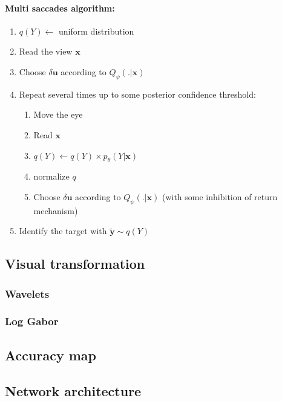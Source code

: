\paragraph{Multi saccades algorithm:}
\begin{enumerate}
\item $q(Y) \leftarrow$ uniform distribution
\item Read the view $\boldsymbol{x}$
\item Choose $\delta\boldsymbol{u}$ according to $Q_\psi(.|\boldsymbol{x})$
\item Repeat several times up to some posterior confidence threshold:
	\begin{enumerate}
		\item Move the eye 		
		\item Read $\boldsymbol{x}$
		\item $q(Y) \leftarrow q(Y) \times p_\theta(Y|\boldsymbol{x})$
		\item normalize $q$
		\item Choose $\delta\boldsymbol{u}$ according to $Q_\psi(.|\boldsymbol{x})$ (with some inhibition of return mechanism)
	\end{enumerate}
	\item Identify the target with $\tilde{\boldsymbol{y}} \sim q(Y)$
\end{enumerate}

\subsection{Visual transformation}
\subsubsection{Wavelets}
\subsubsection{Log Gabor}

\subsection{Accuracy map}

\subsection{Network architecture}
\fi

